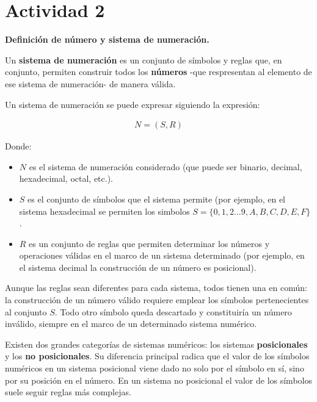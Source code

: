 \section*{Actividad 2}
\textbf{Definición de número y sistema de numeración.}

Un \textbf{sistema de numeración} es un conjunto de símbolos y reglas que, en conjunto, permiten construir todos los \textbf{números} -que respresentan al elemento de ese sistema de numeración- de manera válida.

Un sistema de numeración se puede expresar siguiendo la expresión:

\begin{align*}
N = (S, R)
\end{align*}

Donde:

\begin{itemize}
 \item[] $N$ es el sistema de numeración considerado (que puede ser binario, decimal, hexadecimal, octal, etc.). 
 \item[] $S$ es el conjunto de símbolos que el sistema permite (por ejemplo, en el sistema hexadecimal se permiten los simbolos $S =\{0, 1, 2 \dots 9, A, B, C, D, E, F\}$. 
 \item[] $R$ es un conjunto de reglas que permiten determinar los números y operaciones válidas en el marco de un sistema determinado (por ejemplo, en el sistema decimal la construcción de un número es posicional).
\end{itemize}

Aunque las reglas sean diferentes para cada sistema, todos tienen una en común: la construcción de un número válido requiere emplear los símbolos pertenecientes al conjunto $S$. Todo otro símbolo queda descartado y constituiría un número inválido, siempre en el marco de un determinado sistema numérico. 

Existen dos grandes categorías de sistemas numéricos: los sistemas \textbf{posicionales} y los \textbf{no posicionales}. Su diferencia principal radica que el valor de los símbolos numéricos en un sistema posicional viene dado no solo por el símbolo en sí, sino por su posición en el número. En un sistema no posicional el valor de los símbolos suele seguir reglas más complejas. 

